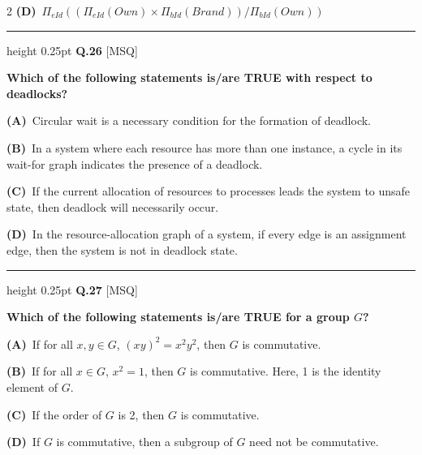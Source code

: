 \documentclass[a4paper,10pt,twoside]{article}
\begin{document}
\begin{multicols}{2}
\textbf{(D)}~$\Pi_{eId}((\Pi_{eId}(Own) \times \Pi_{bId}(Brand)) / \Pi_{bId}(Own))$
\par\vspace{6pt}\hrule height 0.25pt\vspace{6pt}
\noindent\textbf{Q.26} \hfill {\footnotesize\textsf{[MSQ]}}
\par\vspace{2pt}
{\bfseries Which of the following statements is/are TRUE with respect to deadlocks? \par}
\par\vspace{2pt}\noindent
\textbf{(A)}~Circular wait is a necessary condition for the formation of deadlock.\par\vspace{2pt}\noindent
\textbf{(B)}~In a system where each resource has more than one instance, a cycle in its wait-for graph indicates the presence of a deadlock.\par\vspace{2pt}\noindent
\textbf{(C)}~If the current allocation of resources to processes leads the system to unsafe state, then deadlock will necessarily occur.\par\vspace{2pt}\noindent
\textbf{(D)}~In the resource-allocation graph of a system, if every edge is an assignment edge, then the system is not in deadlock state.
\par\vspace{6pt}\hrule height 0.25pt\vspace{6pt}
\noindent\textbf{Q.27} \hfill {\footnotesize\textsf{[MSQ]}}
\par\vspace{2pt}
{\bfseries Which of the following statements is/are TRUE for a group $G$? \par}
\par\vspace{2pt}\noindent
\textbf{(A)}~If for all $x, y \in G$, $(xy)^2 = x^2 y^2$, then $G$ is commutative.\par\vspace{2pt}\noindent
\textbf{(B)}~If for all $x \in G$, $x^2 = 1$, then $G$ is commutative. Here, 1 is the identity element of $G$.\par\vspace{2pt}\noindent
\textbf{(C)}~If the order of $G$ is 2, then $G$ is commutative.\par\vspace{2pt}\noindent
\textbf{(D)}~If $G$ is commutative, then a subgroup of $G$ need not be commutative.

\end{multicols}
\end{document}
